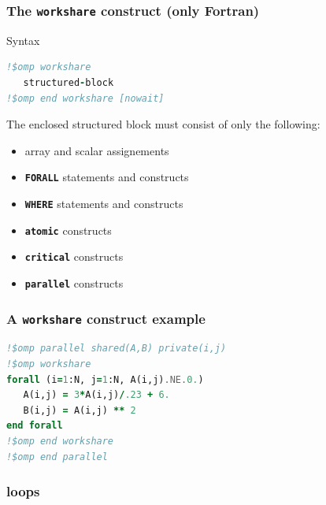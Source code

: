 \begin{frame}[containsverbatim]
\frametitle{The \texttt{workshare} construct (\textbf{only Fortran})}
\begin{exampleblock}{Syntax}
\begin{lstlisting}[language=Fortran,frame=lines]
!$omp workshare
   structured-block
!$omp end workshare [nowait]
\end{lstlisting}
The enclosed structured block must consist of only the following:
\begin{itemize}
\item{array and scalar assignements}
\item{\textbf{\texttt{FORALL}} statements and constructs}
\item{\textbf{\texttt{WHERE}} statements and constructs}
\item{\textbf{\texttt{atomic}} constructs}
\item{\textbf{\texttt{critical}} constructs}
\item{\textbf{\texttt{parallel}} constructs}
\end{itemize}
\end{exampleblock}
\end{frame}



\begin{frame}[containsverbatim]
\frametitle{A \texttt{workshare} construct example}
\begin{lstlisting}[language=Fortran,frame=lines]
!$omp parallel shared(A,B) private(i,j)
!$omp workshare
forall (i=1:N, j=1:N, A(i,j).NE.0.)
   A(i,j) = 3*A(i,j)/.23 + 6.
   B(i,j) = A(i,j) ** 2
end forall
!$omp end workshare
!$omp end parallel
\end{lstlisting}

\end{frame}


\subsubsection[Loops]{loops}

